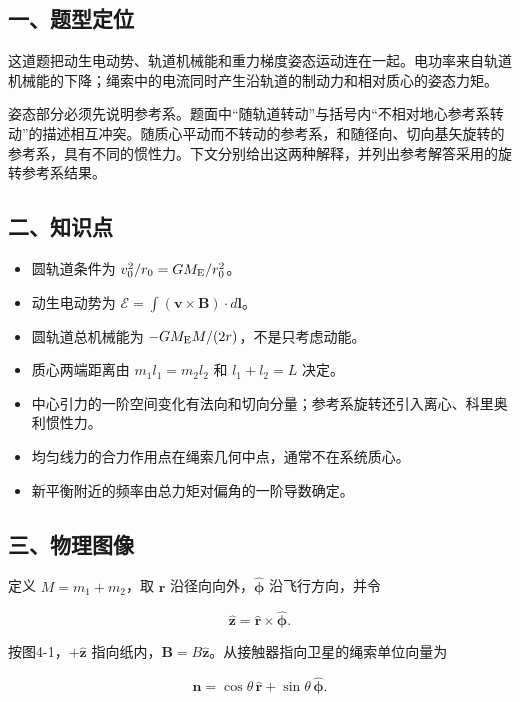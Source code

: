 \documentclass[12pt,a4paper,fontset=fandol]{ctexart}
\providecommand{\tightlist}{\setlength{\itemsep}{0pt}\setlength{\parskip}{0pt}}
\begin{document}
\subsection{一、题型定位}\label{ux4e00ux9898ux578bux5b9aux4f4d-3}

这道题把动生电动势、轨道机械能和重力梯度姿态运动连在一起。电功率来自轨道机械能的下降；绳索中的电流同时产生沿轨道的制动力和相对质心的姿态力矩。

姿态部分必须先说明参考系。题面中``随轨道转动''与括号内``不相对地心参考系转动''的描述相互冲突。随质心平动而不转动的参考系，和随径向、切向基矢旋转的参考系，具有不同的惯性力。下文分别给出这两种解释，并列出参考解答采用的旋转参考系结果。

\subsection{二、知识点}\label{ux4e8cux77e5ux8bc6ux70b9-3}

\begin{itemize}
\tightlist
\item
  圆轨道条件为 \(v_0^2/r_0=GM_{\rm E}/r_0^2\)。
\item
  动生电动势为
  \(\mathcal E=\int(\boldsymbol v\times\boldsymbol B)\cdot d\boldsymbol l\)。
\item
  圆轨道总机械能为 \(-GM_{\rm E}M/(2r)\)，不是只考虑动能。
\item
  质心两端距离由 \(m_1l_1=m_2l_2\) 和 \(l_1+l_2=L\) 决定。
\item
  中心引力的一阶空间变化有法向和切向分量；参考系旋转还引入离心、科里奥利惯性力。
\item
  均匀线力的合力作用点在绳索几何中点，通常不在系统质心。
\item
  新平衡附近的频率由总力矩对偏角的一阶导数确定。
\end{itemize}

\subsection{三、物理图像}\label{ux4e09ux7269ux7406ux56feux50cf-3}

定义 \(M=m_1+m_2\)，取 \(\hat{\boldsymbol r}\)
沿径向向外，\(\hat{\boldsymbol\phi}\) 沿飞行方向，并令

\[
\hat{\boldsymbol z}=\hat{\boldsymbol r}\times\hat{\boldsymbol\phi}.
\]

按图4-1，\(+\hat{\boldsymbol z}\)
指向纸内，\(\boldsymbol B=B\hat{\boldsymbol z}\)。从接触器指向卫星的绳索单位向量为

\[
\boldsymbol n=\cos\theta\,\hat{\boldsymbol r}+\sin\theta\,\hat{\boldsymbol\phi}.
\]
\end{document}
